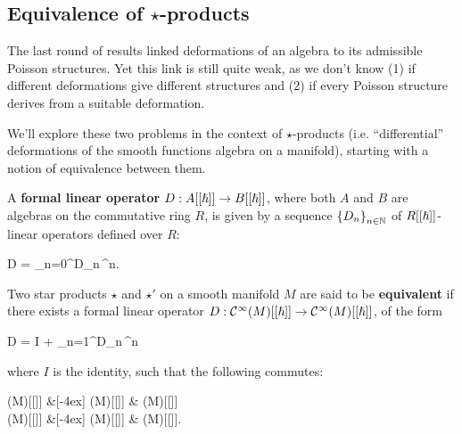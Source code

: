 \subsection[Equivalence of star products]{Equivalence of $\star$-products}
The last round of results linked deformations of an algebra to its admissible Poisson structures. Yet this link is still quite weak, as we don't know (1) if different deformations give different structures and (2) if every Poisson structure derives from a suitable deformation.

We'll explore these two problems in the context of $\star$-products (i.e. ``differential'' deformations of the smooth functions algebra on a manifold), starting with a notion of equivalence between them.

\begin{definition}
	A \textbf{formal linear operator} $D : A[[{\boldsymbol\hslash}]] \to B[[{\boldsymbol\hslash}]]$, where both $A$ and $B$ are algebras on the commutative ring $R$, is given by a sequence $\left\{D_{n}\right\}_{n \in \mathbb{N}}$ of $R[[{\boldsymbol\hslash}]]$-linear operators defined over $R$:
	\begin{eqalign}
		D = \sum_{n=0}^\infty D_n\,\planck^n.
	\end{eqalign}
\end{definition}

\begin{definition}
	Two star products $\star$ and $\star'$ on a smooth manifold $M$ are said to be \textbf{equivalent} if there exists a formal linear operator $D: \mathcal{C}^\infty(M)[[{\boldsymbol\hslash}]] \to \mathcal{C}^\infty(M)[[{\boldsymbol\hslash}]]$, of the form
	\begin{eqalign}
		D = I + \sum_{n=1}^\infty D_n\,\planck^n
	\end{eqalign}
	where $I$ is the identity, such that the following commutes:
	\begin{diagram}
		\Cinfty(M)[[\planck]]   \&[-4ex] \Cinfty(M)[[\planck]]   \& \Cinfty(M)[[\planck]] \\
		\Cinfty(M)[[\planck]]  \&[-4ex] \Cinfty(M)[[\planck]]  \& \Cinfty(M)[[\planck]].
	\end{diagram}
\end{definition}

